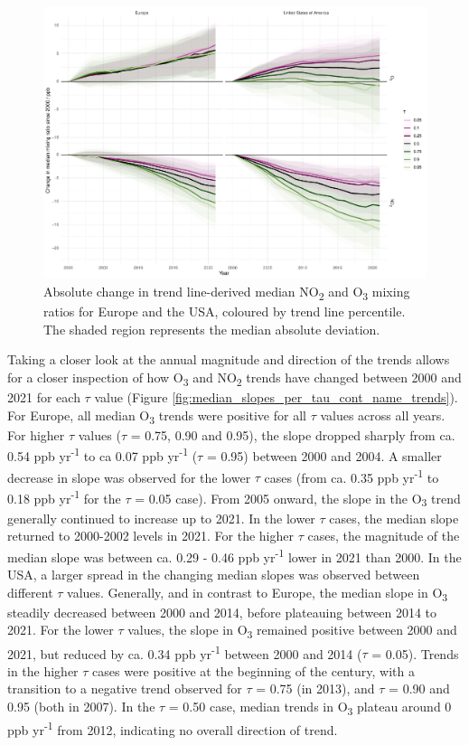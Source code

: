 \documentclass[journal abbreviation, manuscript]{copernicus}
\begin{document}
\begin{figure}[h!]
\includegraphics[width=12cm]{figures/f7_cusum.pdf}
\caption{Absolute change in trend line-derived median NO\textsubscript{2} and O\textsubscript{3} mixing ratios for Europe and the USA, coloured by trend line percentile. The shaded region represents the median absolute deviation.}
\label{fig:median_slopes_per_tau_cont_name_absolute}
\end{figure}

Taking a closer look at the annual magnitude and direction of the trends allows for a closer inspection of how O\textsubscript{3} and NO\textsubscript{2} trends have changed between 2000 and 2021 for each $\tau$ value (Figure \ref{fig:median_slopes_per_tau_cont_name_trends}). For Europe, all median O\textsubscript{3} trends were positive for all $\tau$ values across all years. For higher $\tau$ values ($\tau$ = 0.75, 0.90 and 0.95), the slope dropped sharply from ca. 0.54 ppb yr\textsuperscript{-1} to ca 0.07 ppb yr\textsuperscript{-1} ($\tau$ = 0.95) between 2000 and 2004. A smaller decrease in slope was observed for the lower $\tau$ cases (from ca. 0.35 ppb yr\textsuperscript{-1} to 0.18 ppb yr\textsuperscript{-1} for the $\tau$ = 0.05 case). From 2005 onward, the slope in the O\textsubscript{3} trend generally continued to increase up to 2021. In the lower $\tau$ cases, the median slope returned to 2000-2002 levels in 2021. For the higher $\tau$ cases, the magnitude of the median slope was between ca. 0.29 - 0.46 ppb yr\textsuperscript{-1} lower in 2021 than 2000. In the USA, a larger spread in the changing median slopes was observed between different $\tau$ values. Generally, and in contrast to Europe, the median slope in O\textsubscript{3} steadily decreased between 2000 and 2014, before plateauing between 2014 to 2021. For the lower $\tau$ values, the slope in O\textsubscript{3} remained positive between 2000 and 2021, but reduced by ca. 0.34 ppb yr\textsuperscript{-1} between 2000 and 2014 ($\tau$ = 0.05). Trends in the higher $\tau$ cases were positive at the beginning of the century, with a transition to a negative trend observed for $\tau$ = 0.75 (in 2013), and $\tau$ = 0.90 and 0.95 (both in 2007). In the $\tau$ = 0.50 case, median trends in O\textsubscript{3} plateau around 0 ppb yr\textsuperscript{-1} from 2012, indicating no overall direction of trend.
\end{document}

